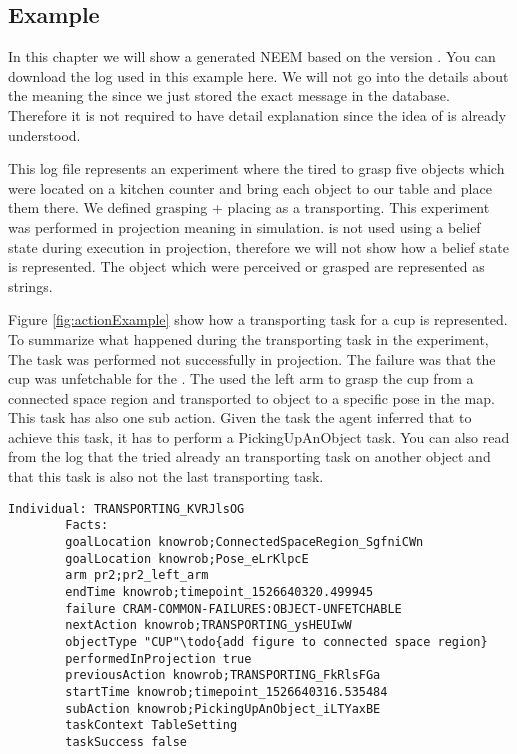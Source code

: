 \subsection{Example}
	\label{ch:example}
	In this chapter we will show a generated NEEM based on the version \neemversion.
	You can download the log used in this example here.	
	We will not go into the details about the \neemexp meaning the \tf {} since we just stored the exact \tf message in the database.
	Therefore it is not required to have detail explanation since the idea of \tf is already understood.
	
	This log file represents an experiment where the \pr tired to grasp five objects which were located on a kitchen counter and bring each object to our table and place them there.
	We defined grasping + placing as a transporting.
	This experiment was performed in projection meaning in simulation.
	\cram is not used using a belief state during execution in projection, therefore we will not show how a belief state is represented.
	The object which were perceived or grasped are represented as strings.
	
	Figure \ref{fig:actionExample} show how a transporting task for a cup is represented.
	To summarize what happened during the transporting task in the experiment,
	The task was performed not successfully in projection. 
	The failure was that the cup was unfetchable for the \pr.
	The \pr used the left arm to grasp the cup from a connected space region and transported to object to a specific pose in the map.
	This task has also one sub action. 
	Given the task the agent inferred that to achieve this task, it has to perform a PickingUpAnObject task.
	You can also read from the log that the  tried already an transporting task on another object and that this task is also not the last transporting task.
	
	\begin{minipage}{\textwidth}
		\scriptsize
		\begin{lstlisting}[frame=single]
		Individual: TRANSPORTING_KVRJlsOG
		Facts: 
		goalLocation knowrob;ConnectedSpaceRegion_SgfniCWn
		goalLocation knowrob;Pose_eLrKlpcE
		arm pr2;pr2_left_arm
		endTime knowrob;timepoint_1526640320.499945
		failure CRAM-COMMON-FAILURES:OBJECT-UNFETCHABLE
		nextAction knowrob;TRANSPORTING_ysHEUIwW
		objectType "CUP"\todo{add figure to connected space region}
		performedInProjection true
		previousAction knowrob;TRANSPORTING_FkRlsFGa
		startTime knowrob;timepoint_1526640316.535484
		subAction knowrob;PickingUpAnObject_iLTYaxBE
		taskContext TableSetting
		taskSuccess false
		\end{lstlisting}

		\label{fig:actionExample}
	\end{minipage}
			\vspace{0.5mm}	
	
